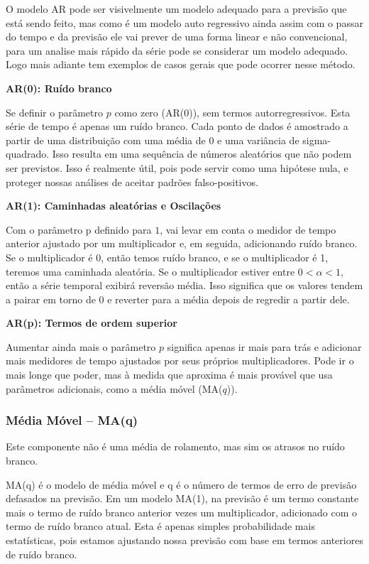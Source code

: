 O modelo AR pode ser visivelmente um modelo adequado para a previsão que está sendo feito, mas como é um modelo auto regressivo ainda assim com o passar do tempo e da previsão ele vai prever de uma forma linear e não convencional, para um analise mais rápido da série pode se considerar um modelo adequado. Logo mais adiante tem exemplos de casos gerais que pode ocorrer nesse método.

\textbf{AR(0): Ru\'ido branco}

Se definir o parâmetro $p$ como zero (AR($0$)), sem termos autorregressivos. Esta série de tempo é apenas um ruído branco. Cada ponto de dados é amostrado a partir de uma distribuição com uma média de $0$ e uma variância de sigma-quadrado. Isso resulta em uma sequência de números aleatórios que não podem ser previstos. Isso é realmente útil, pois pode servir como uma hipótese nula, e proteger nossas análises de aceitar padrões falso-positivos.

\textbf{AR(1): Caminhadas aleat\'orias e Oscila\c c\~oes}



Com o parâmetro p definido para $1$, vai levar em conta o medidor de tempo anterior ajustado por um multiplicador e, em seguida, adicionando ruído branco. Se o multiplicador é $0$, então temos ruído branco, e se o multiplicador é 1, teremos uma caminhada aleatória. Se o multiplicador estiver entre $ 0 < \alpha < 1 $, então a série temporal exibirá reversão média. Isso significa que os valores tendem a pairar em torno de 0 e reverter para a média depois de regredir a partir dele.

\textbf{AR(p): Termos de ordem superior}

Aumentar ainda mais o parâmetro $p$ significa apenas ir mais para trás e adicionar mais medidores de tempo ajustados por seus próprios multiplicadores. Pode ir o mais longe que poder, mas à medida que aproxima é mais provável que usa parâmetros adicionais, como a média móvel (MA($q$)).

\subsubsection{M\'edia M\'ovel -- MA(q)}\label{subsubsec:ma}
Este componente não é uma média de rolamento, mas sim os atrasos no ruído branco. 


MA(q) é o modelo de média móvel e q é o número de termos de erro de previsão defasados na previsão. Em um modelo MA(1), na previsão é um termo constante mais o termo de ruído branco anterior vezes um multiplicador, adicionado com o termo de ruído branco atual. Esta é apenas simples probabilidade mais estatísticas, pois estamos ajustando nossa previsão com base em termos anteriores de ruído branco.

